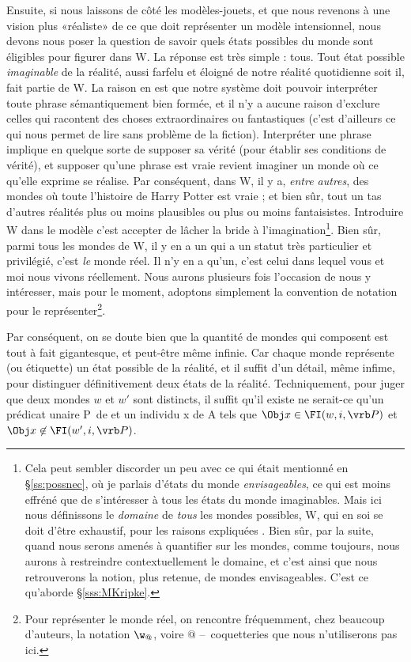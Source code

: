 Ensuite, si nous laissons de côté les modèles-jouets, et que nous revenons à une vision plus «réaliste» de ce que doit représenter un modèle intensionnel, nous devons nous poser la question de savoir quels états possibles du monde sont éligibles pour figurer dans \Unv W. La réponse est très simple : tous. 
Tout état possible \emph{imaginable} de la réalité, aussi farfelu et éloigné de notre réalité quotidienne soit il, fait partie de \Unv W.
La raison en est que notre système  doit pouvoir interpréter toute phrase sémantiquement bien formée, et il n'y a aucune raison d'exclure celles qui racontent des choses extraordinaires ou fantastiques (c'est d'ailleurs ce qui nous permet de lire sans problème de la fiction). Interpréter une phrase implique en quelque sorte de supposer sa vérité (pour établir ses conditions de vérité), et supposer qu'une phrase est vraie revient imaginer un monde où ce qu'elle exprime se réalise. Par conséquent, dans \Unv W, il y a, \emph{entre autres}, des mondes où toute l'histoire de Harry Potter est vraie ; et bien sûr, tout un tas d'autres réalités plus ou moins plausibles ou plus ou moins fantaisistes. Introduire \Unv W dans le modèle c'est accepter de lâcher la bride à l'imagination\footnote{Cela peut sembler discorder un peu avec ce qui était mentionné en \S\ref{ss:possnec}, où je parlais d'états du monde \emph{envisageables}, ce qui est moins effréné que de s'intéresser à tous les états du monde imaginables. Mais ici nous définissons le \emph{domaine} de \emph{tous} les mondes possibles, \Unv W, qui en soi se doit d'être exhaustif, pour les raisons expliquées . Bien sûr, par la suite, quand nous serons amenés à quantifier sur les mondes, comme toujours, nous aurons à restreindre contextuellement le domaine, et c'est ainsi que nous retrouverons la notion, plus retenue, de mondes envisageables. C'est ce qu'aborde \S\ref{sss:MKripke}.}. 
Bien sûr, parmi tous les mondes de \Unv W, il y en a un qui a un statut très particulier et privilégié, c'est \emph{le} monde réel. 
Il n'y en a qu'un, c'est celui dans lequel vous et moi nous vivons réellement. Nous aurons plusieurs fois l'occasion de nous y intéresser, mais pour le moment, adoptons simplement la convention de notation {\wo} pour le représenter\footnote{Pour représenter le monde réel, on rencontre fréquemment, chez beaucoup d'auteurs, la notation $\w_{@}$, voire $@$ --~coquetteries que nous n'utiliserons pas ici.}.

Par conséquent, on se doute bien que la quantité de mondes qui
composent  est tout à fait gigantesque, et peut-être même infinie. Car chaque monde
représente (ou étiquette) un état possible de la réalité, et il suffit
d'un détail, même infime, pour distinguer définitivement deux états de la réalité.  Techniquement, pour juger que deux mondes $w$ et $w'$ sont distincts, il suffit qu'il existe ne serait-ce qu'un prédicat unaire \vrb P\ de {\LO} et un individu \Obj x de \Unv A tels que \(\Obj x \in \FI(w,i,\vrb P)\) et \(\Obj x \not\in \FI(w',i,\vrb P)\).

